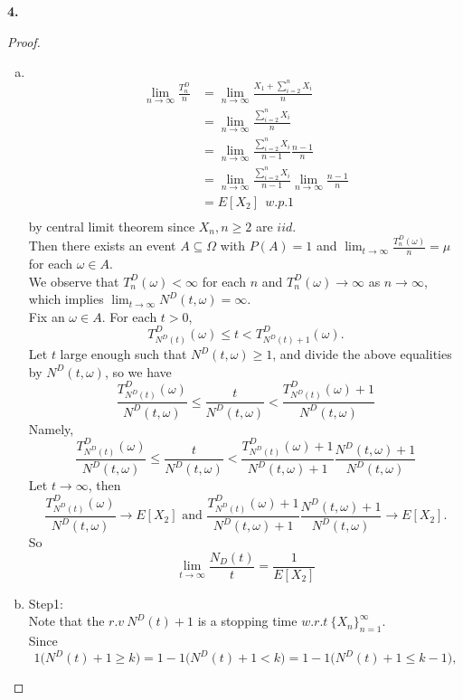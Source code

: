 \documentclass{amsart}
\theoremstyle{plain}
\theoremstyle{definition}
\begin{document}
\vspace{5mm}

\noindent \textbf{4.}\\
\begin{proof}
	\begin{enumerate}[(a)]
	\item
	$ $\newline
	\begin{align*}
		\lim_{n \to \infty} \frac{T^D_n}{n} &= \lim_{n\to \infty} \frac{X_1+\sum_{i=2}^{n}X_i}{n}\\ 
									      &= \lim_{n\to \infty} \frac{\sum_{i=2}^{n}X_i}{n} \\
									  	  &= \lim_{n\to \infty} \frac{\sum_{i=2}^{n}X_i}{n-1}\frac{n-1}{n}\\
			 						  	  &= \lim_{n\to \infty} \frac{\sum_{i=2}^{n}X_i}{n-1} \lim_{n\to \infty}\frac{n-1}{n}\\	
							  			  &= E[X_2] \ \ w.p.1\\
	\end{align*}
	by central limit theorem since $X_n, n \geq 2$ are $iid$.\\
	Then there exists an event $A \subseteq \Omega$ with $P(A) = 1$ and $\lim_{t\to \infty}\frac{T^D_n(\omega)}{n} = \mu$ for each $\omega \in A$.\\
	We observe that $T^D_n(\omega) < \infty$ for each $n$ and $T^D_n(\omega) \to \infty$ as $n\to \infty$, which implies $\lim_{t\to \infty}N^D(t,\omega) = \infty$.\\
	Fix an $\omega \in A$. For each $t>0$, 
		\[ T^D_{N^D(t)}(\omega) \leq t < T^D_{N^D(t)+1}(\omega).\]
	Let $t$ large enough such that $N^D(t,\omega) \geq 1$, and divide the above equalities by $N^D(t,\omega)$, so we have 
	\[ \frac{T^D_{N^D(t)}(\omega)}{N^D(t,\omega)} \leq \frac{t}{N^D(t,\omega)} < \frac{T^D_{N^D(t)}(\omega)+1}{N^D(t,\omega)} \]
	Namely,	
	\[ \frac{T^D_{N^D(t)}(\omega)}{N^D(t,\omega)} \leq \frac{t}{N^D(t,\omega)} < \frac{T^D_{N^D(t)}(\omega)+1}{N^D(t,\omega)+1} \frac{{N^D(t,\omega)+1}}{N^D(t,\omega)} \]
	Let $t\to \infty$, then
	\[ \frac{T^D_{N^D(t)}(\omega)}{N^D(t,\omega)} \to E[X_2] \text{ and } \frac{T^D_{N^D(t)}(\omega)+1}{N^D(t,\omega)+1} \frac{{N^D(t,\omega)+1}}{N^D(t,\omega)} \to E[X_2].\]	
	So 
	\[ \lim_{t\to \infty} \frac{N_D(t)}{t} = \frac{1}{E[X_2]} \]
	\item 
	Step1:\\
	Note that the $r.v\ N^D(t)+1$ is a stopping time $w.r.t\ \{X_n\}_{n=1}^{\infty}$.\\
	Since 
	\[ 1\big({N^D(t)+1 \geq k}\big) = 1-1\big({N^D(t)+1 < k}\big) = 1-1\big({N^D(t)+1 \leq k-1}\big), \]

\end{enumerate}
\end{proof}
\end{document}

